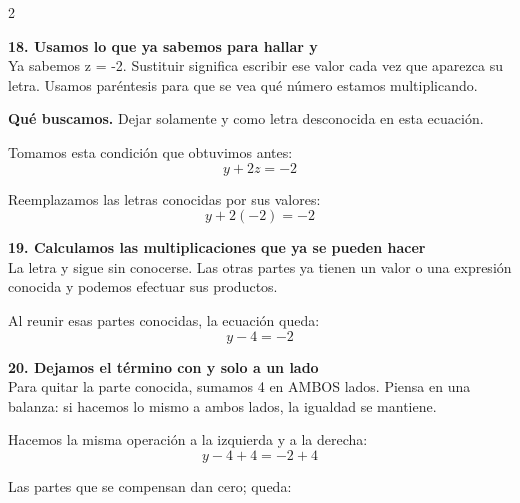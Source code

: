 \documentclass[11pt,a4paper,landscape]{article}
\begin{document}
\begin{multicols*}{2}
\begin{minipage}{\linewidth}
\end{minipage}\par\medskip
\noindent\begin{minipage}{\linewidth}\textbf{18. Usamos lo que ya sabemos para hallar y}\\[2pt]Ya sabemos z = -2. Sustituir significa escribir ese valor cada vez que aparezca su letra. Usamos paréntesis para que se vea qué número estamos multiplicando.
\par\smallskip\textbf{Qué buscamos.} Dejar solamente y como letra desconocida en esta ecuación.
\par\smallskip Tomamos esta condición que obtuvimos antes:
\[y + 2z = -2\]
\par\smallskip Reemplazamos las letras conocidas por sus valores:
\[y + 2\left(-2\right)=-2\]
\end{minipage}\par\medskip
\noindent\begin{minipage}{\linewidth}\textbf{19. Calculamos las multiplicaciones que ya se pueden hacer}\\[2pt]La letra y sigue sin conocerse. Las otras partes ya tienen un valor o una expresión conocida y podemos efectuar sus productos.
\par{}\par\smallskip
\par\smallskip Al reunir esas partes conocidas, la ecuación queda:
\[y - 4=-2\]
\end{minipage}\par\medskip
\noindent\begin{minipage}{\linewidth}\textbf{20. Dejamos el término con y solo a un lado}\\[2pt]Para quitar la parte conocida, sumamos 4 en AMBOS lados. Piensa en una balanza: si hacemos lo mismo a ambos lados, la igualdad se mantiene.
\par\smallskip Hacemos la misma operación a la izquierda y a la derecha:
\[y - 4 + 4=-2 + 4\]
\par\smallskip Las partes que se compensan dan cero; queda:

\end{minipage}
\end{multicols*}
\end{document}
